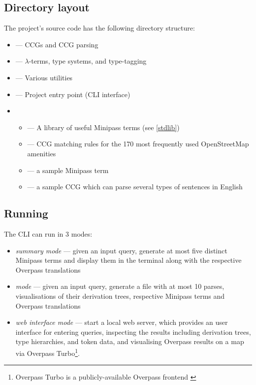 \documentclass[main.tex]{subfiles}
\begin{document}
\subsection{Directory layout}

The project's source code has the following directory structure:
\begin{itemize}
    \item {} --- CCGs and CCG parsing
    \item {} --- $\lambda$-terms, type systems, and type-tagging
    \item {} --- Various utilities
    \item {} --- Project entry point (CLI interface)
    \item {}
        \begin{itemize}
            \item {} --- A library of useful Minipass terms
                (see \cref{stdlib})
            \item {} --- CCG matching rules for the 170 most
                frequently used OpenStreetMap amenities
            \item {} --- a sample Minipass term
            \item {} --- a sample CCG which can parse several
                types of sentences in English
        \end{itemize}
\end{itemize}

\subsection{Running}
The CLI can run in 3 modes:
\begin{itemize}
    \item \emph{summary mode} --- given an input query, generate at most five
        distinct Minipass terms and display them in the terminal along with
        the respective Overpass translations
    \item \emph{\latex mode} --- given an input query, generate a 
        file with at most 10 parses, visualisations of their derivation trees,
        respective Minipass terms and Overpass translations
    \item \emph{web interface mode} --- start a local web server, which provides
        an user interface for entering queries, inspecting the results including
        derivation trees, type hierarchies, and token data, and visualising
        Overpass results on a map via Overpass Turbo\footnote{
            Overpass Turbo is a publicly-available Overpass frontend \cite{overpassturbo}
        }.
\end{itemize}
\end{document}
